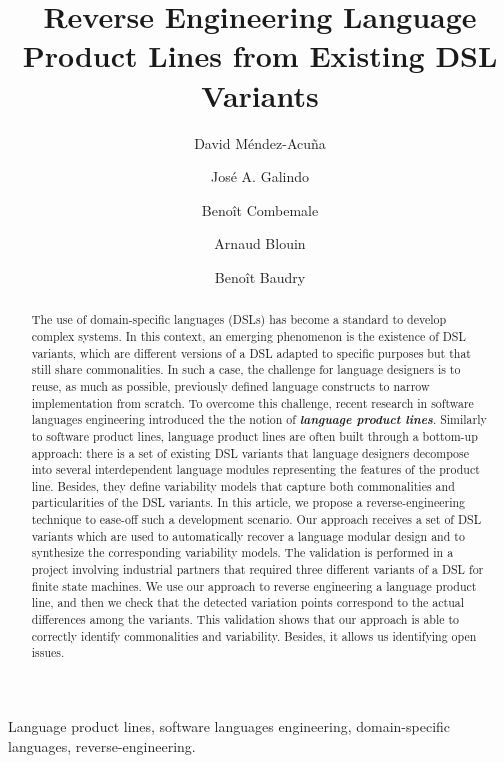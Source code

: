 \documentclass[preprint,5p]{elsarticle}
\begin{document}
\begin{frontmatter}

\title{Reverse Engineering Language Product Lines from Existing DSL Variants}

\author{David M\'endez-Acu\~na}

\author{Jos\'e A. Galindo}

\author{Beno\^it Combemale}

\author{Arnaud Blouin}

\author{Beno\^it Baudry}

\address{INRIA/IRISA and University of Rennes 1, France}

\begin{abstract}
The use of domain-specific languages (DSLs) has become a standard to develop complex systems. In this context, an emerging phenomenon is the existence of DSL variants, which are different versions of a DSL adapted to specific purposes but that still share commonalities. In such a case, the challenge for language designers is to reuse, as much as possible, previously defined language constructs to narrow implementation from scratch. To overcome this challenge, recent research in software languages engineering introduced the the notion of \textit{\textbf{language product lines}}. Similarly to software product lines, language product lines are often built through a bottom-up approach: there is a set of existing DSL variants that language designers decompose into several interdependent language modules representing the features of the product line. Besides, they define variability models that capture both commonalities and particularities of the DSL variants. In this article, we propose a reverse-engineering technique to ease-off such a development scenario. Our approach receives a set of DSL variants which are used to automatically recover a language modular design and to synthesize the corresponding variability models. The validation is performed in a project involving industrial partners that required three different variants of a DSL for finite state machines. We use our approach to reverse engineering a language product line, and then we check that the detected variation points correspond to the actual differences among the variants. This validation shows that our approach is able to correctly identify commonalities and variability. Besides, it allows us identifying open issues.

\end{abstract}

\begin{keyword}
Language product lines, software languages engineering, domain-specific languages, reverse-engineering.
\end{keyword}

\end{frontmatter}
\end{document}
